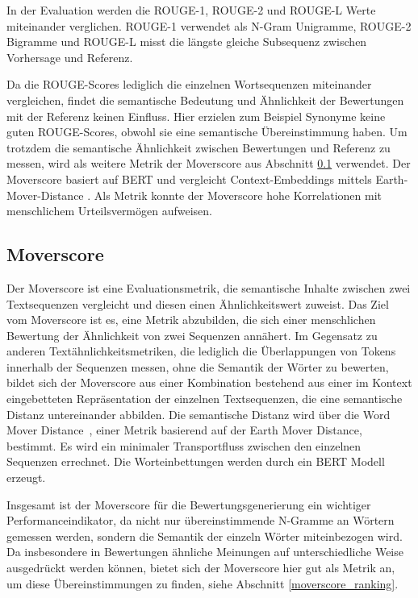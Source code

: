 In der Evaluation werden die ROUGE-1, ROUGE-2 und ROUGE-L Werte miteinander verglichen.
ROUGE-1 verwendet als N-Gram Unigramme, ROUGE-2 Bigramme und ROUGE-L misst die längste gleiche Subsequenz zwischen Vorhersage und Referenz.

Da die ROUGE-Scores lediglich die einzelnen Wortsequenzen miteinander vergleichen, findet die semantische Bedeutung und Ähnlichkeit der Bewertungen mit der Referenz keinen Einfluss.
Hier erzielen zum Beispiel Synonyme keine guten ROUGE-Scores, obwohl sie eine semantische Übereinstimmung haben.
Um trotzdem die semantische Ähnlichkeit zwischen Bewertungen und Referenz zu messen, wird als weitere Metrik der Moverscore aus Abschnitt \ref{moverscore} verwendet.
Der Moverscore basiert auf BERT und vergleicht Context-Embeddings mittels Earth-Mover-Distance \citep{emd}. Als Metrik konnte der Moverscore hohe Korrelationen mit menschlichem Urteilsvermögen aufweisen.


\subsection{Moverscore}
\label{moverscore}
Der Moverscore \citep{moverscore_paper} ist eine Evaluationsmetrik, die semantische Inhalte zwischen zwei Textsequenzen vergleicht und diesen einen Ähnlichkeitswert zuweist.
Das Ziel vom Moverscore ist es, eine Metrik abzubilden, die sich einer menschlichen Bewertung der Ähnlichkeit von zwei Sequenzen annähert. 
Im Gegensatz zu anderen Textähnlichkeitsmetriken, die lediglich die Überlappungen von Tokens innerhalb der Sequenzen messen, ohne die Semantik der Wörter zu bewerten, 
bildet sich der Moverscore aus einer Kombination bestehend aus einer im Kontext eingebetteten Repräsentation der einzelnen Textsequenzen, die eine semantische Distanz untereinander abbilden.
Die semantische Distanz wird über die Word Mover Distance \citep{wordmoverdistance}, einer Metrik basierend auf der Earth Mover Distance, bestimmt. Es wird ein minimaler Transportfluss zwischen den einzelnen Sequenzen errechnet.
Die Worteinbettungen werden durch ein BERT Modell erzeugt.

Insgesamt ist der Moverscore für die Bewertungsgenerierung ein wichtiger Performanceindikator, da nicht nur übereinstimmende N-Gramme an Wörtern gemessen werden, sondern die Semantik der einzeln Wörter miteinbezogen wird. 
Da insbesondere in Bewertungen ähnliche Meinungen auf unterschiedliche Weise ausgedrückt werden können, bietet sich der Moverscore hier gut als Metrik an, um diese Übereinstimmungen zu finden, siehe Abschnitt \ref{moverscore_ranking}.


